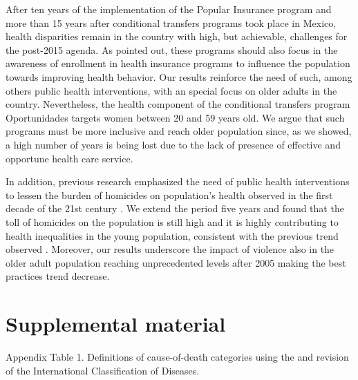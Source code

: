 \documentclass{article}
\begin{document}
After ten years of the implementation of the Popular Insurance program and more than 15 years after conditional transfers programs took place in Mexico, health disparities remain in the country with high, but achievable, challenges for the post-2015 agenda. As \citet{biosca2015} pointed out, these programs should also focus in the awareness of enrollment in health insurance programs to influence the population towards improving health behavior. Our results reinforce the need of such, among others public health interventions, with an special focus on older adults in the country. Nevertheless, the health component of the conditional transfers program Oportunidades targets women between 20 and 59 years old. We argue that such programs must be more inclusive and reach older population since, as we showed, a high number of years is being lost due to the lack of presence of effective and opportune health care service. 

In addition, previous research emphasized the need of public health interventions to lessen the burden of homicides on population's health observed in the first decade of the 21st century \citep{canudas2014, Aburto2015}. We extend the period five years and found that the toll of homicides on the population is still high and it is highly contributing to health inequalities in the young population, consistent with the previous trend observed \citep{canudas2014}. Moreover, our results underscore the impact of violence also in the older adult population reaching unprecedented levels after 2005 making the best practices trend decrease. 

\section*{Supplemental material}

Appendix Table 1. Definitions of cause-of-death categories using the  and  revision of the International Classification of Diseases.\\
\end{document}
